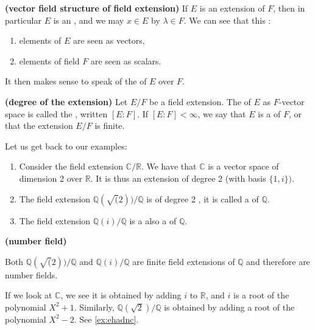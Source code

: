 \documentclass{article}
\newcommand{\bfs}[1]{\textbf{({#1}) }}
\begin{document}
\begin{defa}\bfs{vector field structure of field extension}
If $E$ is an extension of $F$, then in particular $E$ is an , and we may  $x \in E$ by $\lambda \in F$. We can see that this :
\begin{enumerate}
    \item  elements of $E$ are seen as vectors, 
    \item elements of field $F$ are seen as scalars.
\end{enumerate}
It then makes sense to speak of the  of $E$ over $F$.
\end{defa}
\begin{defa}\bfs{degree of the extension}
Let $E / F$ be a field extension. The  of $E$ as $F$-vector space is called the , written $[E: F]$. If $[E: F]<\infty$, we say that $E$ is a  of $F$, or that the extension $E / F$ is finite.
\end{defa} 
\begin{exma}Let us get back to our examples:
\begin{enumerate}
    \item Consider the field extension $\mathbb{C} / \mathbb{R}$. We have that $\mathbb{C}$ is a vector space of dimension 2 over $\mathbb{R}$. It is thus an extension of degree 2 (with basis $\{1, i\})$.
    \item The field extension $\mathbb{Q}(\sqrt{(} 2)) / \mathbb{Q}$ is of degree 2 , it is called a  of $\mathbb{Q}$.
    \item The field extension $\mathbb{Q}(i) / \mathbb{Q}$ is a also a  of $\mathbb{Q}$.
\end{enumerate}
\end{exma}
\begin{defa}\bfs{number field}
\end{defa}
\begin{exma}
Both $\mathbb{Q}(\sqrt{(} 2)) / \mathbb{Q}$ and $\mathbb{Q}(i) / \mathbb{Q}$ are finite field extensions of $\mathbb{Q}$ and therefore are number fields.
\end{exma}
\begin{rema}
 If we look at $\mathbb{C}$, we see it is obtained by adding $i$ to $\mathbb{R}$, and $i$ is a root of the polynomial $X^{2}+1$. Similarly, $\mathbb{Q}(\sqrt{2}) / \mathbb{Q}$ is obtained by adding a root of the polynomial $X^{2}-2$. See \cref{ex:ehadnc}.
\end{rema}
\end{document}

